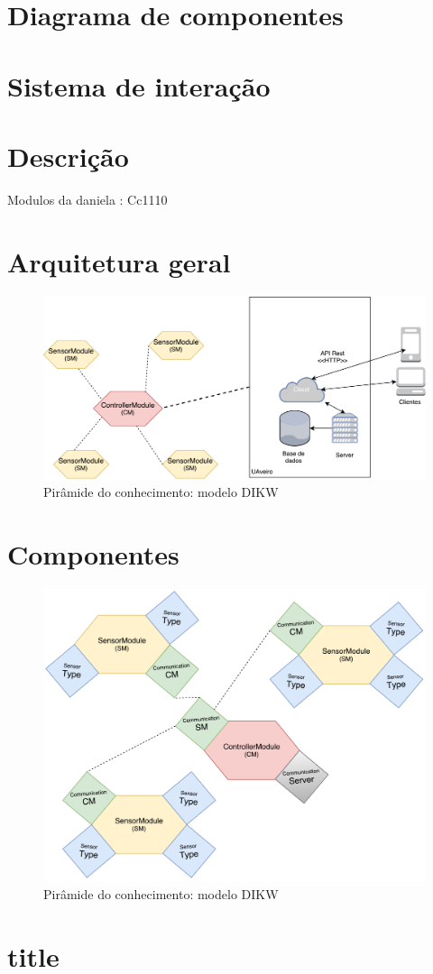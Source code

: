 \section{Diagrama de componentes}




\section{Sistema de interação}


\section{Descrição}


Modulos da daniela : Cc1110



\section{Arquitetura geral}

\begin{figure}[!htb]
	\centering
	\includegraphics[scale=0.55]{esquemas/arquitetura_geral.pdf}
	\caption{Pirâmide do conhecimento: modelo DIKW}
	\label{dikw}
\end{figure}


\newpage


\section{Componentes}


\begin{figure}[!htb]
	\centering
	\includegraphics[scale=0.55]{esquemas/general-electronic-modules.pdf}
	\caption{Pirâmide do conhecimento: modelo DIKW}
	\label{dikw}
\end{figure}


\section{title}